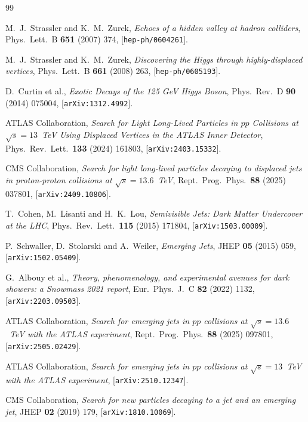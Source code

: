 \documentclass[a4paper,11pt]{article}
\begin{document}
\begin{thebibliography}{99}

M.~J.~Strassler and K.~M.~Zurek,
\emph{Echoes of a hidden valley at hadron colliders},
Phys.\ Lett.\ B \textbf{651} (2007) 374, [\texttt{hep-ph/0604261}].

M.~J.~Strassler and K.~M.~Zurek,
\emph{Discovering the Higgs through highly-displaced vertices},
Phys.\ Lett.\ B \textbf{661} (2008) 263, [\texttt{hep-ph/0605193}].

D.~Curtin et al.,
\emph{Exotic Decays of the 125 GeV Higgs Boson},
Phys.\ Rev.\ D \textbf{90} (2014) 075004, [\texttt{arXiv:1312.4992}].

ATLAS Collaboration,
\emph{Search for Light Long-Lived Particles in $pp$ Collisions at
$\sqrt{s} = 13$~TeV Using Displaced Vertices in the ATLAS Inner
Detector},
Phys.\ Rev.\ Lett.\ \textbf{133} (2024) 161803,
[\texttt{arXiv:2403.15332}].

CMS Collaboration,
\emph{Search for light long-lived particles decaying to displaced jets
in proton-proton collisions at $\sqrt{s} = 13.6$~TeV},
Rept.\ Prog.\ Phys.\ \textbf{88} (2025) 037801,
[\texttt{arXiv:2409.10806}].

T.~Cohen, M.~Lisanti and H.~K.~Lou,
\emph{Semivisible Jets: Dark Matter Undercover at the LHC},
Phys.\ Rev.\ Lett.\ \textbf{115} (2015) 171804,
[\texttt{arXiv:1503.00009}].

P.~Schwaller, D.~Stolarski and A.~Weiler,
\emph{Emerging Jets},
JHEP \textbf{05} (2015) 059, [\texttt{arXiv:1502.05409}].

G.~Albouy et al.,
\emph{Theory, phenomenology, and experimental avenues for dark showers:
a Snowmass 2021 report},
Eur.\ Phys.\ J.\ C \textbf{82} (2022) 1132, [\texttt{arXiv:2203.09503}].

ATLAS Collaboration,
\emph{Search for emerging jets in $pp$ collisions at $\sqrt{s} = 13.6$~TeV
with the ATLAS experiment},
Rept.\ Prog.\ Phys.\ \textbf{88} (2025) 097801,
[\texttt{arXiv:2505.02429}].

ATLAS Collaboration,
\emph{Search for emerging jets in $pp$ collisions at $\sqrt{s} = 13$~TeV
with the ATLAS experiment},
[\texttt{arXiv:2510.12347}].

CMS Collaboration,
\emph{Search for new particles decaying to a jet and an emerging jet},
JHEP \textbf{02} (2019) 179, [\texttt{arXiv:1810.10069}].


\end{thebibliography}
\end{document}

